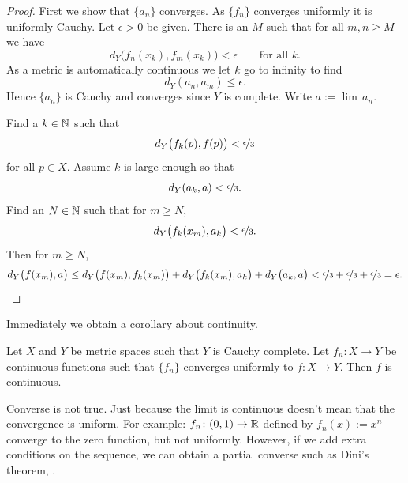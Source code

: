\begin{proof}
First we show that $\{ a_n \}$ converges.  As
$\{ f_n \}$ converges uniformly it is uniformly Cauchy. 
Let $\epsilon > 0$ be given.  There is
an $M$ such that for all $m,n \geq M$ we have
\begin{equation*}
d_Y\bigl(f_n(x_k),f_m(x_k)\bigr) < \epsilon \qquad \text{for all } k .
\end{equation*}
As a metric is automatically continuous we let $k$ go to infinity
to find
\begin{equation*}
d_Y(a_n,a_m) \leq \epsilon .
\end{equation*}
Hence $\{a_n\}$ is Cauchy and converges since $Y$ is complete.  Write
$a := \lim \, a_n$.

Find a $k \in {\mathbb{N}}$ such that
\begin{equation*}
d_Y\bigl(f_k(p),f(p)\bigr) < \nicefrac{\epsilon}{3}
\end{equation*}
for all $p \in X$.  Assume $k$ is large enough
so that
\begin{equation*}
d_Y(a_k,a) < \nicefrac{\epsilon}{3}  .
\end{equation*}
Find an $N \in {\mathbb{N}}$ such that for $m \geq N$,
\begin{equation*}
d_Y\bigl(f_k(x_m),a_k\bigr) < \nicefrac{\epsilon}{3}  .
\end{equation*}
Then for
$m \geq N$,
\begin{equation*}
d_Y\bigl(f(x_m),a\bigr)
\leq
d_Y\bigl(f(x_m),f_k(x_m)\bigr)
+
d_Y\bigl(f_k(x_m),a_k\bigr)
+
d_Y\bigl(a_k,a\bigr)
<
\nicefrac{\epsilon}{3} +
\nicefrac{\epsilon}{3} +
\nicefrac{\epsilon}{3} = \epsilon . \qedhere
\end{equation*}
\end{proof}

Immediately we obtain a corollary about continuity.

\begin{cor} \label{cor:metricuniformcontinuous}
Let $X$ and $Y$ be metric spaces such that $Y$ is Cauchy complete.
Let $f_n \colon X \to Y$ be continuous functions
such that
$\{ f_n \}$ converges uniformly to $f \colon X \to Y$.  
Then $f$ is continuous.
\end{cor}

Converse is not true.  Just because the limit is continuous doesn't mean
that the convergence is uniform.  For example:
$f_n \colon (0,1) \to {\mathbb{R}}$ defined by $f_n(x) := x^n$ converge to
the zero function, but not uniformly.  However, if we add extra conditions
on the sequence, we can obtain a partial converse such as Dini's theorem,
.

